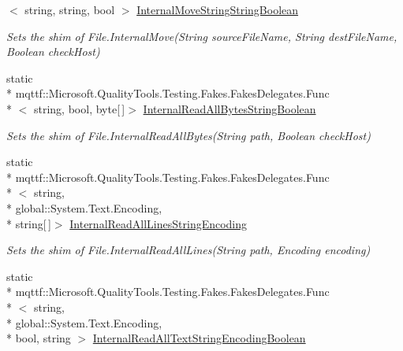 \begin{DoxyCompactItemize}
$<$ string, string, bool $>$ \hyperlink{class_system_1_1_i_o_1_1_fakes_1_1_shim_file_ab2b5e0f13ee8547e3fad8811c9ca2bdb}{Internal\-Move\-String\-String\-Boolean}
\begin{DoxyCompactList}\small\item\em Sets the shim of File.\-Internal\-Move(\-String source\-File\-Name, String dest\-File\-Name, Boolean check\-Host)\end{DoxyCompactList}\item 
static \\*
mqttf\-::\-Microsoft.\-Quality\-Tools.\-Testing.\-Fakes.\-Fakes\-Delegates.\-Func\\*
$<$ string, bool, byte\mbox{[}$\,$\mbox{]}$>$ \hyperlink{class_system_1_1_i_o_1_1_fakes_1_1_shim_file_a93008e34b43da4540e4ce3469e0c81f4}{Internal\-Read\-All\-Bytes\-String\-Boolean}
\begin{DoxyCompactList}\small\item\em Sets the shim of File.\-Internal\-Read\-All\-Bytes(\-String path, Boolean check\-Host)\end{DoxyCompactList}\item 
static \\*
mqttf\-::\-Microsoft.\-Quality\-Tools.\-Testing.\-Fakes.\-Fakes\-Delegates.\-Func\\*
$<$ string, \\*
global\-::\-System.\-Text.\-Encoding, \\*
string\mbox{[}$\,$\mbox{]}$>$ \hyperlink{class_system_1_1_i_o_1_1_fakes_1_1_shim_file_a07b957f33a6e19ae474ede4f61b0eb7e}{Internal\-Read\-All\-Lines\-String\-Encoding}
\begin{DoxyCompactList}\small\item\em Sets the shim of File.\-Internal\-Read\-All\-Lines(\-String path, Encoding encoding)\end{DoxyCompactList}\item 
static \\*
mqttf\-::\-Microsoft.\-Quality\-Tools.\-Testing.\-Fakes.\-Fakes\-Delegates.\-Func\\*
$<$ string, \\*
global\-::\-System.\-Text.\-Encoding, \\*
bool, string $>$ \hyperlink{class_system_1_1_i_o_1_1_fakes_1_1_shim_file_a0e6f7a0669e0ddd86d86eb915f4d8de1}{Internal\-Read\-All\-Text\-String\-Encoding\-Boolean}

\end{DoxyCompactItemize}
